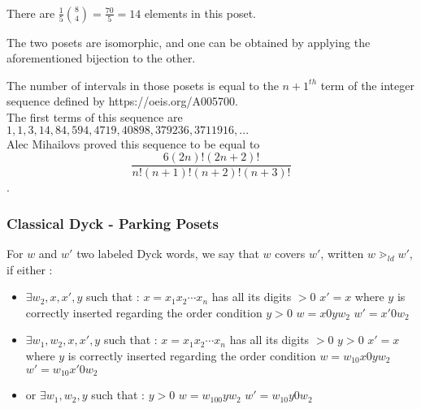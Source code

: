 \begin{example}
    ~\\
    \begin{center}
        
        There are $\frac {1}{5} \binom{8}{4} = \frac{70}{5} = 14$
        elements in this poset.
    \end{center}
\end{example}

\begin{rem}
    The two posets are isomorphic, and one can be obtained by
    applying the aforementioned bijection to the other.
\end{rem}

\begin{theorem}
    The number of intervals in those posets is equal to
    the $n+1^{th}$ term of the integer sequence defined by
    https://oeis.org/A005700.\\
    The first terms of this sequence are $1, 1, 3, 14, 84,
    594, 4719, 40898, 379236, 3711916, ...$\\
    Alec Mihailovs proved this sequence to be equal to
    $$\frac {6 (2n)! (2n+2)!}{n!(n+1)!(n+2)!(n+3)!}$$.
\end{theorem}

\subsubsection{Classical Dyck - Parking Posets}

\begin{definition}[$\gtrdot_{ld}$]
    For $w$ and $w'$ two labeled Dyck words, we say
    that $w$ covers $w'$, written $w \gtrdot_{ld} w'$,
    if either :
    \begin{itemize}
        \item $\exists w_2, x, x', y$ such that :
            \subitem $x = x_1x_2 \cdots x_n$ has all 
            its digits $> 0$
            \subitem $x' = x$ where $y$ is correctly
            inserted regarding the order condition
            \subitem $y > 0$
            \subitem $w = x0yw_2$
            \subitem $w' = x'0w_2$
        \item $\exists w_1, w_2, x, x', y$ such that :
            \subitem $x = x_1x_2 \cdots x_n$ has all 
                its digits $> 0$
            \subitem $y > 0$
            \subitem $x' = x$ where $y$ is correctly
                inserted regarding the order condition
            \subitem $w = w_10x0yw_2$
            \subitem $w' = w_10x'0w_2$
        \item or $\exists w_1, w_2, y$ such that :
            \subitem $y > 0$
            \subitem $w = w_100yw_2$
            \subitem $w' = w_10y0w_2$
    \end{itemize}  
\end{definition}

